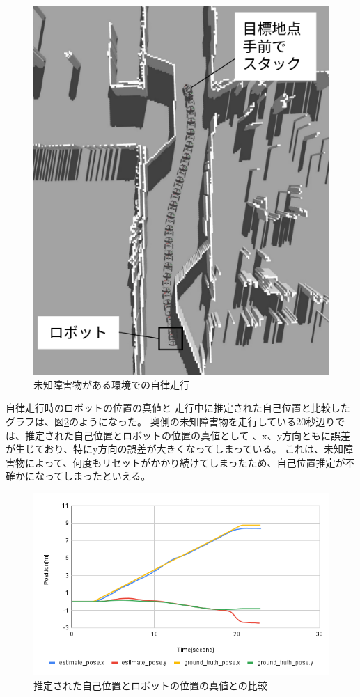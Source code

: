 \begin{figure}[H]
  \begin{center}
    \includegraphics[width=0.5\linewidth]{figs/no_implementation_with_reset.png}
    \caption{未知障害物がある環境での自律走行}
    \label{fig:nav_no_imp}
  \end{center}
\end{figure}

自律走行時のロボットの位置の真値と
走行中に推定された自己位置と比較したグラフは、図\ref{fig:odom_comp_no_imp}のようになった。
奥側の未知障害物を走行している20秒辺りでは、推定された自己位置とロボットの位置の真値として
、x、y方向ともに誤差が生じており、特にy方向の誤差が大きくなってしまっている。
これは、未知障害物によって、何度もリセットがかかり続けてしまったため、自己位置推定が不確かになってしまったといえる。

\begin{figure}[H]
  \begin{center}
    \includegraphics[width=0.98\linewidth]{figs/sim_no_imp_ground_truth.png}
    \caption{推定された自己位置とロボットの位置の真値との比較}
    \label{fig:odom_comp_no_imp}
  \end{center}
\end{figure}

